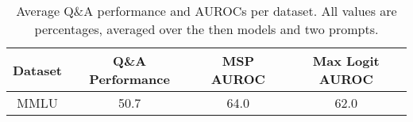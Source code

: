 \begin{table*}
\centering
\begin{tabular}{c|c|c|c}
Dataset & Q\&A Performance & MSP AUROC & Max Logit AUROC\\ \hline
MMLU & 50.7 & 64.0 & 62.0\\
\hline
\end{tabular}
\caption{Average Q\&A performance and AUROCs per dataset. All values are percentages, averaged over the then models and two prompts.}
\label{tab:dataset}
\end{table*}
